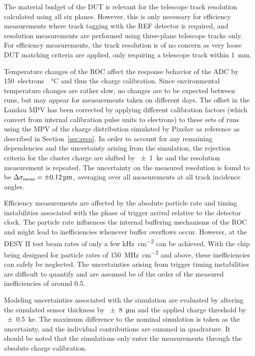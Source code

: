 \documentclass[a4paper,11pt]{article}
\begin{document}
The material budget of the DUT is relevant for the telescope track resolution calculated using all six planes.
However, this is only necessary for efficiency measurements where track tagging with the REF detector is required, and resolution measurements are performed using three-plane telescope tracks only.
For efficiency measurements, the track resolution is of no concern as very loose DUT matching criteria are applied, only requiring a telescope track within \SI{1}{\milli\meter}.

Temperature changes of the ROC affect the response behavior of the ADC by \SI{150}{electrons \per \celsius} and thus the charge calibration.
Since environmental temperature changes are rather slow, no changes are to be expected between runs, but may appear for measurements taken on different days.
The offset in the Landau MPV has been corrected by applying different calibration factors (which convert from internal calibration pulse units to electrons) to these sets of runs using the MPV of the charge distribution simulated by Pixelav as reference as described in Section~\ref{sec:reco}.
In order to account for any remaining dependencies and the uncertainty arising from the simulation, the rejection criteria for the cluster charge are shifted by \SI{\pm1}{\kilo e} and the resolution measurement is repeated.
The uncertainty on the measured resolution is found to be $\Delta \sigma_{\mathrm{meas}} = \SI{\pm0.12}{\micro\meter}$, averaging over all measurements at all track incidence angles.

Efficiency measurements are affected by the absolute particle rate and timing instabilities associated with the phase of trigger arrival relative to the detector clock.
The particle rate influences the internal buffering mechanisms of the ROC and might lead to inefficiencies whenever buffer overflows occur.
However, at the DESY II test beam rates of only a few \si{\kHz \per \square \centi\meter} can be achieved.
With the chip being designed for particle rates of \SI{150}{\MHz \per \square \centi\meter} and above, these inefficiencies can safely be neglected.
The uncertainties arising from trigger timing instabilities are difficult to quantify and are assumed be of the order of the measured inefficiencies of around 0.5\textperthousand.

Modeling uncertainties associated with the simulation are evaluated by altering the simulated sensor thickness by \SI{\pm8}{\um} and the applied charge threshold by \SI{\pm0.5}{ke}.
The maximum difference to the nominal simulation is taken as the uncertainty, and the individual contributions are summed in quadrature.
It should be noted that the simulations only enter the measurements through the absolute charge calibration.
\end{document}
